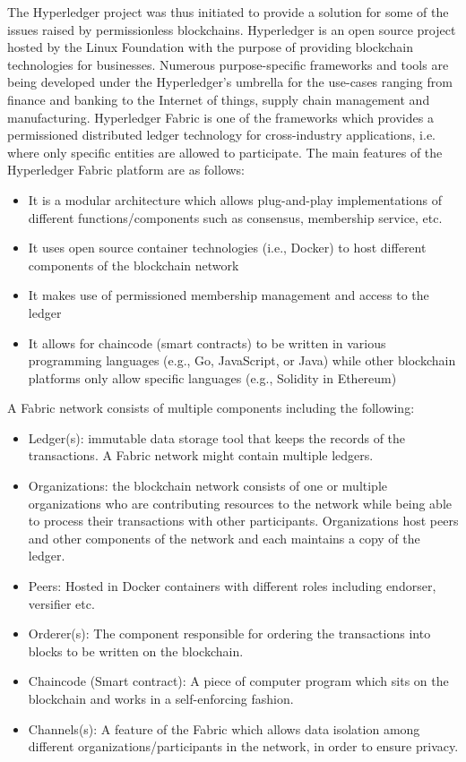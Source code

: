 \documentclass[conference]{IEEEtran}
\begin{document}
The Hyperledger project was thus initiated to provide a solution for some of the issues raised by permissionless blockchains. Hyperledger is an open source project hosted by the Linux Foundation with the purpose of providing blockchain technologies for businesses. Numerous purpose-specific frameworks and tools are being developed under the Hyperledger's umbrella for the use-cases ranging from finance and banking to the Internet of things, supply chain management and manufacturing.
Hyperledger Fabric is one of the frameworks which provides a permissioned distributed ledger technology for cross-industry applications, i.e. where only specific entities are allowed to participate. The main features of the Hyperledger Fabric platform are as follows:

\begin{itemize}
    \item It is a modular architecture which allows plug-and-play implementations of different functions/components such as consensus, membership service, etc.
    \item It uses open source container technologies (i.e., Docker) to host different components of the blockchain network
    \item It makes use of permissioned membership management and access to the ledger
    \item It allows for chaincode (smart contracts) to be written in various programming languages (e.g., Go, JavaScript, or Java) while other blockchain platforms only allow specific languages (e.g., Solidity in Ethereum)
    
\end{itemize}

A Fabric network consists of multiple components including the following:

\begin{itemize}
    \item Ledger(s): immutable data storage tool that keeps the records of the transactions. A Fabric network might contain multiple ledgers.
    \item Organizations: the blockchain network consists of one or multiple organizations who are contributing resources to the network while being able to process their transactions with other participants. Organizations host peers and other components of the network and each maintains a copy of the ledger.
    \item Peers: Hosted in Docker containers with different roles including endorser, versifier etc.
    \item Orderer(s): The component responsible for ordering the transactions into blocks to be written on the blockchain.
    \item Chaincode (Smart contract): A piece of computer program which sits on the blockchain and works in a self-enforcing fashion.
    \item Channels(s): A feature of the Fabric which allows data isolation among different organizations/participants in the network, in order to ensure privacy.
\end{itemize}
\end{document}
